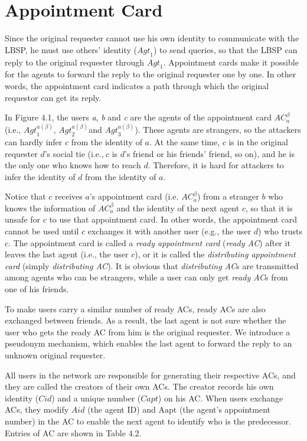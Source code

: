 \section{ Appointment Card}

\noindent Since the original requester cannot use his own identity to communicate with the LBSP, he must use others' identity (${Agt}_1$) to send queries, so that the LBSP can reply to the original requester through ${Agt}_1$. Appointment cards make it possible for the agents to forward the reply to the original requester one by one. In other words, the appointment card indicates a path through which the original requestor can get its reply. 

In Figure 4.1, the users \textit{a}, \textit{b} and \textit{c} are the agents of the appointment card ${AC}^{\beta }_a$ (i.e., ${Agt}^{a\left(\beta \right)}_1$, ${Agt}^{a\left(\beta \right)}_2$and ${Agt}^{a\left(\beta \right)}_3$). These agents are strangers, so the attackers can hardly infer $c$ from the identity of $a$. At the same time, $c$ is in the original requester $d$'s social tie (i.e.,$\ c$ is $d$'s friend or his friends' friend, so on), and he is the only one who knows how to reach $d$. Therefore, it is hard for attackers to infer the identity of $d$ from the identity of $a$.

Notice that $c$ receives $a$'s appointment card (i.e. ${AC}^{\beta }_a$) from a stranger $b$ who knows the information of ${AC}^{\beta }_a$ and the identity of the next agent $c$, so that it is unsafe for $c$ to use that appointment card. In other words, the appointment card cannot be used until $c$ exchanges it with another user (e.g., the user $d$) who trusts $c$. The appointment card is called a \textit{ready appointment card} (\textit{ready AC}) after it leaves the last agent (i.e., the user $c$), or it is called the \textit{distributing appointment card} (simply \textit{distributing AC}). It is obvious that \textit{distributing AC}s are transmitted among agents who can be strangers, while a user can only get \textit{ready AC}s from  one of his friends.

To make users carry a similar number of ready ACs, ready ACs are also exchanged between friends. As a result, the last agent is not sure whether the user who gets the ready AC from him is the original requester. We introduce a pseudonym mechanism, which enables the last agent to forward the reply to an unknown original requester. 

All users in the network are responsible for generating their respective ACs, and they are called the creators of their own ACs. The creator records his own identity ($Cid$) and a unique number ($Capt$) on his AC. When users exchange ACs, they modify $Aid$ (the agent ID) and $\mathrm{Aapt}$ (the agent's appointment number) in the AC to enable the next agent to identify who is the predecessor. Entries of AC are shown in Table 4.2.


